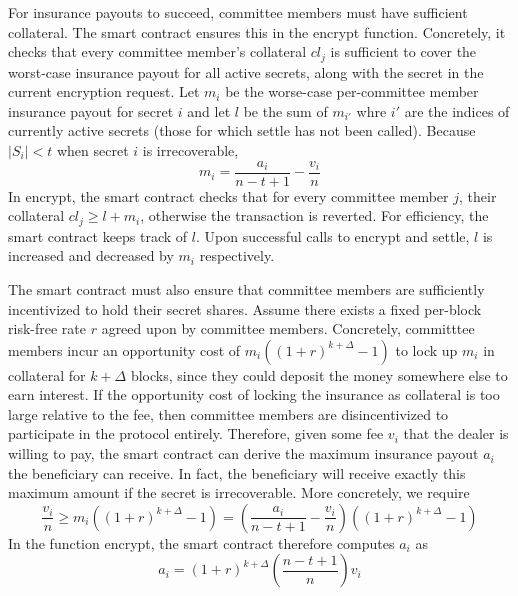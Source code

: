 For insurance payouts to succeed, committee members must have sufficient collateral.
The smart contract ensures this in the \textsf{encrypt} function.
Concretely, it checks that every committee member's collateral $cl_j$ is sufficient to cover the worst-case insurance payout for all active secrets, along with the secret in the current encryption request.
Let $m_i$ be the worse-case per-committee member insurance payout for secret $i$ and let $l$ be the sum of $m_{i'}$ whre $i'$ are the indices of currently active secrets (those for which \textsf{settle} has not been called).
Because $|S_i| < t$ when secret $i$ is irrecoverable,
\begin{equation}\label{worst-case-payout}
    m_i = \frac{a_{i}}{n-t+1} - \frac{v_i}{n} 
\end{equation}
In \textsf{encrypt}, the smart contract checks that for every committee member $j$, their collateral $cl_j \geq l + m_i$, otherwise the transaction is reverted.
For efficiency, the smart contract keeps track of $l$.
Upon successful calls to \textsf{encrypt} and \textsf{settle}, $l$ is increased and decreased by $m_i$ respectively.

The smart contract must also ensure that committee members are sufficiently incentivized to hold their secret shares.
Assume there exists a fixed per-block risk-free rate $r$ agreed upon by committee members.
Concretely, committtee members incur an opportunity cost of $m_i((1 + r)^{k + \Delta} - 1)$ to lock up $m_i$ in collateral for $k + \Delta$ blocks, since they could deposit the money somewhere else to earn interest.
If the opportunity cost of locking the insurance as collateral is too large relative to the fee, then committee members are disincentivized to participate in the protocol entirely.
Therefore, given some fee $v_i$ that the dealer is willing to pay, the smart contract can derive the maximum insurance payout $a_i$ the beneficiary can receive.
In fact, the beneficiary will receive exactly this maximum amount if the secret is irrecoverable.
More concretely, we require
\begin{equation}\label{fee_collateral_ineq}
    \frac{v_i}{n} \geq m_i((1 + r)^{k + \Delta} - 1) = (\frac{a_i}{n - t + 1} - \frac{v_i}{n})((1+r)^{k + \Delta} - 1)
\end{equation}
In the function \textsf{encrypt}, the smart contract therefore computes $a_i$ as
\begin{equation}\label{fee_collateral_eq}
    a_i = (1+r)^{k + \Delta}(\frac{n - t + 1}{n})v_i
\end{equation}

